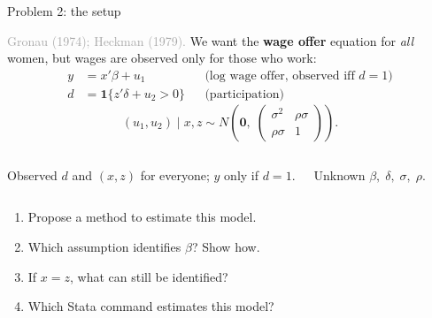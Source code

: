 \documentclass[aspectratio=169,11pt]{beamer}
\newcommand{\ind}{\mathbf{1}}
\newcommand{\Part}[1]{\textcolor{DarkRed}{\textbf{(#1)}}}
\begin{document}
\begin{frame}{Problem 2: the setup}

\textcolor{DarkGray}{Gronau (1974); Heckman (1979).}
We want the \textbf{wage offer} equation for \emph{all} women, but wages
are observed only for those who work:
\begin{align*}
y &= x'\beta + u_1
  &&\text{(log wage offer, observed iff } d=1)\\
d &= \ind\{z'\delta + u_2 > 0\}
  &&\text{(participation)}
\end{align*}
\[
(u_1, u_2)\mid x,z \sim N\!\left(\bm 0,\;
\begin{pmatrix} \sigma^2 & \rho\sigma\\ \rho\sigma & 1\end{pmatrix}\right).
\]

\begin{columns}[T]
\begin{block}{Observed}
$d$ and $(x,z)$ for everyone; \; $y$ only if $d=1$.
\end{block}
\begin{block}{Unknown}
$\beta,\;\delta,\;\sigma,\;\rho$.
\end{block}
\end{columns}

\vspace{0.3em}

\begin{enumerate}\small
  \item[\Part{1}] Propose a method to estimate this model.
  \item[\Part{2}] Which assumption identifies $\beta$? Show how.
  \item[\Part{3}] If $x=z$, what can still be identified?
  \item[\Part{4}] Which Stata command estimates this model?
\end{enumerate}

\end{frame}
\end{document}
